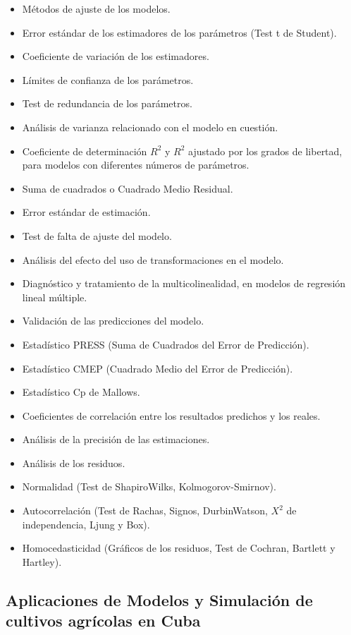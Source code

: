 \begin{itemize}
	\item Métodos de ajuste de los modelos.
	\item Error estándar de los estimadores de los parámetros (Test t de Student).
	\item Coeficiente de variación de los estimadores.
	\item Límites de confianza de los parámetros.
	\item Test de redundancia de los parámetros.
	\item Análisis de varianza relacionado con el modelo en cuestión.
	\item Coeficiente de determinación $R^2$ y $R^2$ ajustado por los grados de libertad, para modelos con diferentes números de parámetros.
	\item Suma de cuadrados o Cuadrado Medio Residual.
	\item Error estándar de estimación.
	\item Test de falta de ajuste del modelo.
	\item Análisis del efecto del uso de transformaciones en el modelo.
	\item Diagnóstico y tratamiento de la multicolinealidad, en modelos de regresión lineal múltiple.
	\item Validación de las predicciones del modelo.
	\item Estadístico PRESS (Suma de Cuadrados del Error de Predicción).
	\item Estadístico CMEP (Cuadrado Medio del Error de Predicción).
	\item Estadístico Cp de Mallows.
	\item Coeficientes de correlación entre los resultados predichos y los reales.
	\item Análisis de la precisión de las estimaciones.
	\item Análisis de los residuos.
	\item Normalidad (Test de ShapiroWilks, Kolmogorov-Smirnov).
	\item Autocorrelación (Test de Rachas, Signos, DurbinWatson, $X^2$ de independencia, Ljung y Box).
	\item Homocedasticidad (Gráficos de los residuos, Test de Cochran, Bartlett y Hartley).
\end{itemize}

\subsection{Aplicaciones de Modelos y Simulación de cultivos agrícolas en Cuba}

